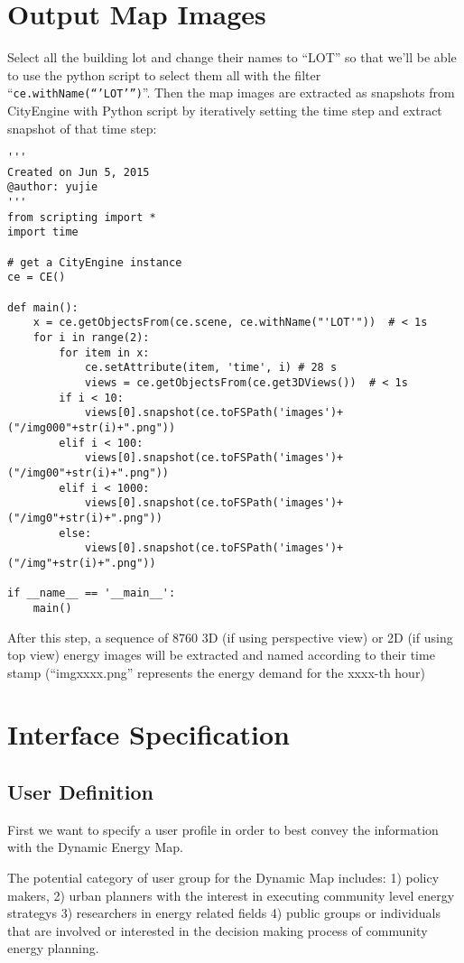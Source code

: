 \section{Output Map Images}
Select all the building lot and change their names to ``LOT'' so that
we’ll be able to use the python script to select them all with the
filter ``\texttt{ce.withName(“’LOT’”)}''. Then the map images are
extracted as snapshots from CityEngine with Python script by
iteratively setting the time step and extract snapshot of that time
step:

\makeatletter
\def\verbatim@font{\linespread{1}\tiny\ttfamily} \makeatother
\begin{verbatim}
'''
Created on Jun 5, 2015
@author: yujie
'''
from scripting import *
import time

# get a CityEngine instance
ce = CE()

def main():
    x = ce.getObjectsFrom(ce.scene, ce.withName("'LOT'"))  # < 1s
    for i in range(2):
        for item in x:
            ce.setAttribute(item, 'time', i) # 28 s
            views = ce.getObjectsFrom(ce.get3DViews())  # < 1s
        if i < 10:
            views[0].snapshot(ce.toFSPath('images')+("/img000"+str(i)+".png"))
        elif i < 100:
            views[0].snapshot(ce.toFSPath('images')+("/img00"+str(i)+".png"))
        elif i < 1000:
            views[0].snapshot(ce.toFSPath('images')+("/img0"+str(i)+".png"))
        else:
            views[0].snapshot(ce.toFSPath('images')+("/img"+str(i)+".png"))

if __name__ == '__main__':
    main()
\end{verbatim}
After this step, a sequence of 8760 3D (if using perspective view) or
2D (if using top view) energy images will be extracted and named
according to their time stamp (``imgxxxx.png'' represents the energy
demand for the xxxx-th hour)

\section{Interface Specification}\label{interfaceSpec}
\subsection{User Definition}
First we want to specify a user profile in order to best convey the
information with the Dynamic Energy Map.

The potential category of user group for the Dynamic Map includes: 1)
policy makers, 2) urban planners with the interest in executing
community level energy strategys 3) researchers in energy related
fields 4) public groups or individuals that are involved or interested
in the decision making process of community energy planning.

